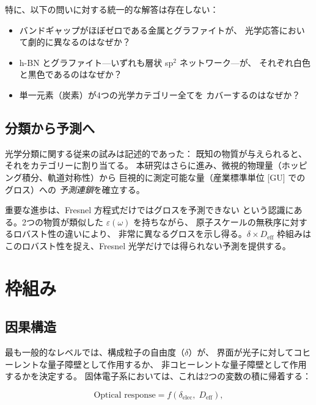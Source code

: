 \documentclass[twocolumn,showpacs,preprintnumbers,amsmath,amssymb,prb]{revtex4-2}
\begin{document}
特に、以下の問いに対する統一的な解答は存在しない：
\begin{itemize}
  \item バンドギャップがほぼゼロである金属とグラファイトが、
    光学応答において劇的に異なるのはなぜか？
  \item h-BN とグラファイト---いずれも層状 sp$^2$ ネットワーク---が、
    それぞれ白色と黒色であるのはなぜか？
  \item 単一元素（炭素）が4つの光学カテゴリー全てを
    カバーするのはなぜか？
\end{itemize}

\subsection{分類から予測へ}

光学分類に関する従来の試みは記述的であった：
既知の物質が与えられると、それをカテゴリーに割り当てる。
本研究はさらに進み、微視的物理量（ホッピング積分、軌道対称性）から
巨視的に測定可能な量（産業標準単位 [GU] でのグロス）への
\emph{予測連鎖}を確立する。

重要な進歩は、Fresnel 方程式だけではグロスを予測できない
という認識にある。2つの物質が類似した $\varepsilon(\omega)$ を持ちながら、
原子スケールの無秩序に対するロバスト性の違いにより、
非常に異なるグロスを示し得る。$\delta \times D_\mathrm{eff}$ 枠組みは
このロバスト性を捉え、Fresnel 光学だけでは得られない予測を提供する。

\section{枠組み}
\label{sec:framework}

\subsection{因果構造}

最も一般的なレベルでは、構成粒子の自由度（$\delta$）が、
界面が光子に対してコヒーレントな量子障壁として作用するか、
非コヒーレントな量子障壁として作用するかを決定する。
固体電子系においては、これは2つの変数の積に帰着する：

\begin{equation}
  \text{Optical response} = f\!\left(\delta_\mathrm{elec},\;
  D_\mathrm{eff}\right),
  \label{eq:causal}
\end{equation}
\end{document}
